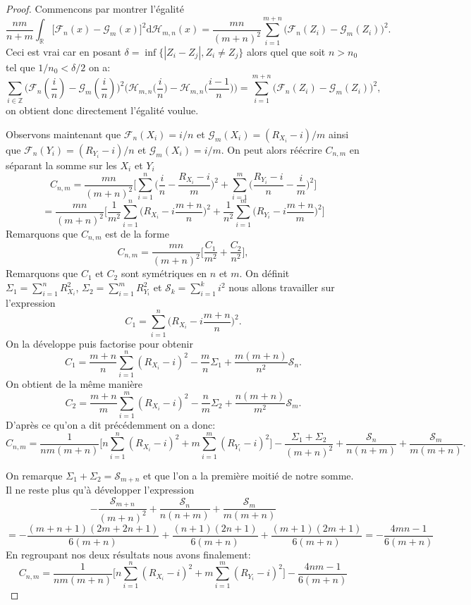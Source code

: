 \documentclass[a4paper,10pt]{article}
\begin{document}
\begin{proof}

	\noindent Commencons par montrer l'égalité
	\[\frac{nm}{n+m}\int_{\mathbb{R}}\big[ \mathcal{F}_{n}(x)-\mathcal{G}_{m}(x)\big]^{2} \mathrm{d} \mathcal{H}_{m,n}(x)=\frac{mn}{(m+n)^2}\sum_{i=1}^{m+n}\big(\mathcal{F}_n(Z_i)-\mathcal{G}_{m}(Z_i)\big)^2.\]
	Ceci est vrai car en posant $\delta=\inf \{|Z_i-Z_j|, Z_i \neq Z_j\}$ alors quel que soit $n>n_0$ tel que $1/n_0< \delta/2$ on a: 
	\[\sum_{i \in \mathbb{Z}}\big(\mathcal{F}_n(\frac{i}{n})-\mathcal{G}_{m}(\frac{i}{n})\big)^2\Big( \mathcal{H}_{m,n}\big(\frac{i}{n}\big)-\mathcal{H}_{m,n}\big(\frac{i-1}{n}\big)\Big)=\sum_{i=1}^{m+n}\big(\mathcal{F}_n(Z_i)-\mathcal{G}_{m}(Z_i)\big)^2,\]
	on obtient donc directement l'égalité voulue.
	
	Observons maintenant que $\mathcal{F}_n(X_i)=i/n$ et $\mathcal{G}_m(X_i)=(R_{X_i}-i)/m$ ainsi que $\mathcal{F}_n(Y_i)=(R_{Y_i}-i)/n$ et $\mathcal{G}_m(X_i)=i/m$. On peut alors réécrire $C_{n,m}$ en séparant la somme sur les $X_i$ et $Y_i$
	\[C_{n,m} = \frac{mn}{(m+n)^2}\Big[\sum_{i=1}^{n} \Big(\frac{i}{n}-\frac{R_{X_i}-i}{m}\Big)^2+ \sum_{i=1}^{m}\Big(\frac{R_{Y_i}-i}{n}-\frac{i}{m}\Big)^2 \Big]\]
	\[=\frac{mn}{(m+n)^2}\Big[\frac{1}{m^2}\sum_{i=1}^{n}\Big(R_{X_i}-i\frac{m+n}{n}\Big)^2 +
	\frac{1}{n^2}\sum_{i=1}^{m}\Big(R_{Y_i}-i\frac{m+n}{m}\Big)^2\Big]\]
	Remarquons que $C_{n,m}$ est de la forme
	\[C_{n,m}=\frac{mn}{(m+n)^2}\Big[\frac{C_1}{m^2}+\frac{C_2}{n^2} \Big],\]
	Remarquons que $C_1$ et $C_2$ sont symétriques en $n$ et $m$. On définit $\Sigma_1=\sum_{i=1}^{n}R^{2}_{X_i}$, $\Sigma_2=\sum_{i=1}^{m}R^{2}_{Y_i}$ et $\mathcal{S}_{k}=\sum_{i=1}^{k}i^2$ nous allons travailler sur l'expression
	\[C_1=\sum_{i=1}^{n}\Big(R_{X_i}-i\frac{m+n}{n}\Big)^2.\]
	On la développe puis factorise pour obtenir
	\[C_1=\frac{m+n}{n}\sum_{i=1}^{n}(R_{X_i}-i)^2-\frac{m}{n}\Sigma_1+\frac{m(m+n)}{n^2}\mathcal{S}_n.\]
	On obtient de la même manière
	\[C_2=\frac{m+n}{m}\sum_{i=1}^{m}(R_{X_i}-i)^2-\frac{n}{m}\Sigma_2+\frac{n(m+n)}{m^2}\mathcal{S}_m.\]
	D'après ce qu'on a dit précédemment on a donc: 
	\[C_{n,m}=\frac{1}{nm(m+n)}\Big[ n\sum_{i=1}^{n}(R_{X_i}-i)^2+ m\sum_{i=1}^{m}(R_{Y_i}-i)^2\Big]-\frac{\Sigma_1+\Sigma_2}{(m+n)^2}+ \frac{\mathcal{S}_n}{n(n+m)}+ \frac{\mathcal{S}_m}{m(m+n)}.\]
	
	On remarque $\Sigma_1+\Sigma_2 = \mathcal{S}_{m+n}$ et que l'on a la première moitié de notre somme. 
	Il ne reste plus qu'à développer l'expression 
	\[-\frac{\mathcal{S}_{m+n}}{(m+n)^2}+ \frac{\mathcal{S}_n}{n(n+m)}+ \frac{\mathcal{S}_m}{m(m+n)}\]
	\[=-\frac{(m+n+1)(2m+2n+1)}{6(m+n)}+ \frac{(n+1)(2n+1)}{6(m+n)}+\frac{(m+1)(2m+1)}{6(m+n)}=-\frac{4mn-1}{6(m+n)}\]
	En regroupant nos deux résultats nous avons finalement:
	\[C_{n,m}=\frac{1}{nm(m+n)}\Big[ n\sum_{i=1}^{n}(R_{X_i}-i)^2+ m\sum_{i=1}^{m}(R_{Y_i}-i)^2\Big]-\frac{4nm-1}{6(m+n)}\]
	
\end{proof}	
	
\newpage


\end{document}
